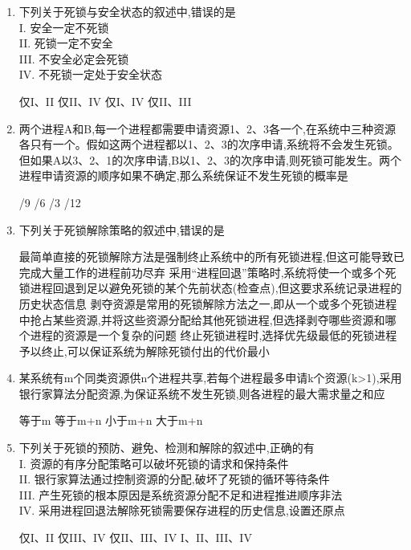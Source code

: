 \documentclass[12pt, a4paper, oneside, UTF8]{ctexbook}
\begin{document}
\begin{enumerate}
    \item 下列关于死锁与安全状态的叙述中,错误的是\\
    I. 安全一定不死锁\\
    II. 死锁一定不安全\\
    III. 不安全必定会死锁\\
    IV. 不死锁一定处于安全状态
    \begin{choices}[2]
    \task 仅I、II
    \task 仅II、IV
    \task 仅I、IV
    \task 仅II、III
    \end{choices}

    \item 两个进程A和B,每一个进程都需要申请资源1、2、3各一个,在系统中三种资源各只有一个。假如这两个进程都以1、2、3的次序申请,系统将不会发生死锁。但如果A以3、2、1的次序申请,B以1、2、3的次序申请,则死锁可能发生。两个进程申请资源的顺序如果不确定,那么系统保证不发生死锁的概率是
    \begin{choices}
    /9
    /6
    /3
    /12
    \end{choices}

    \item 下列关于死锁解除策略的叙述中,错误的是
    \begin{choices}[1]
    \task 最简单直接的死锁解除方法是强制终止系统中的所有死锁进程,但这可能导致已完成大量工作的进程前功尽弃
    \task 采用“进程回退”策略时,系统将使一个或多个死锁进程回退到足以避免死锁的某个先前状态(检查点),但这要求系统记录进程的历史状态信息
    \task 剥夺资源是常用的死锁解除方法之一,即从一个或多个死锁进程中抢占某些资源,并将这些资源分配给其他死锁进程,但选择剥夺哪些资源和哪个进程的资源是一个复杂的问题
    \task 终止死锁进程时,选择优先级最低的死锁进程予以终止,可以保证系统为解除死锁付出的代价最小
    \end{choices}

    \item 某系统有m个同类资源供n个进程共享,若每个进程最多申请k个资源(k>1),采用银行家算法分配资源,为保证系统不发生死锁,则各进程的最大需求量之和应
    \begin{choices}[2]
    \task 等于m
    \task 等于m+n
    \task 小于m+n
    \task 大于m+n
    \end{choices}

    \item 下列关于死锁的预防、避免、检测和解除的叙述中,正确的有\\
    I. 资源的有序分配策略可以破坏死锁的请求和保持条件\\
    II. 银行家算法通过控制资源的分配,破坏了死锁的循环等待条件\\
    III. 产生死锁的根本原因是系统资源分配不足和进程推进顺序非法\\
    IV. 采用进程回退法解除死锁需要保存进程的历史信息,设置还原点
    \begin{choices}[2]
    \task 仅I、II
    \task 仅III、IV
    \task 仅II、III、IV
    \task I、II、III、IV
    \end{choices}


\end{enumerate}
\end{document}
